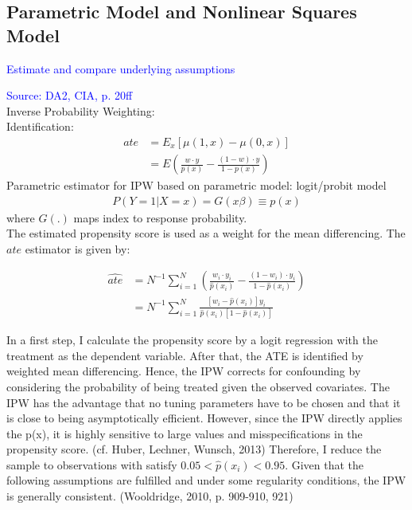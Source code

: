 \documentclass{article}
\begin{document}
\subsection{Parametric Model and Nonlinear Squares Model}

\textcolor{blue}{Estimate and compare underlying assumptions}

\textcolor{blue}{Source: DA2, CIA, p. 20ff}\\
Inverse Probability Weighting: \\
Identification:
\begin{align}
    ate &= E_x[\mu(1,x) - \mu(0,x)] \\
    &= E \left( \frac{w \cdot y}{p(x)} - \frac{(1-w) \cdot y}{1-p(x)}  \right)
\end{align}
Parametric estimator for IPW based on parametric model: logit/probit model\\
\begin{align}
    P(Y=1|X=x) = G(x\beta) \equiv p(x)
\end{align}
where $G(.)$ maps index to response probability. \\
The estimated propensity score is used as a weight for the mean differencing. The $ate$ estimator is given by:

\begin{align}
    \widehat{ate} &= N^{-1} \sum_{i=1}^{N} \left( \frac{w_i \cdot y_i}{\hat{p}(x_i)} - \frac{(1-w_i) \cdot y_i}{1-\hat{p}(x_i)}  \right) \\
    &= N^{-1} \sum_{i=1}^{N}  \frac{[w_i - \hat{p}(x_i)]y_i}{\hat{p}(x_i)[1-\hat{p}(x_i)]}  
\end{align}

In a first step, I calculate the propensity score by a logit regression with the treatment as the dependent variable. After that, the ATE is identified by weighted mean differencing. Hence, the IPW corrects for confounding by considering the probability of being treated given the observed covariates. The IPW has the advantage that no tuning parameters have to be chosen and that it is close to being asymptotically efficient. However, since the IPW directly applies the p(x), it is highly sensitive to large values and misspecifications in the propensity score. (cf. Huber, Lechner, Wunsch, 2013) Therefore, I reduce the sample to observations with satisfy $0.05 < \hat{p}(x_i) < 0.95$.
Given that the following assumptions are fulfilled and under some regularity conditions, the IPW is generally consistent. (Wooldridge, 2010, p. 909-910, 921)
\end{document}
